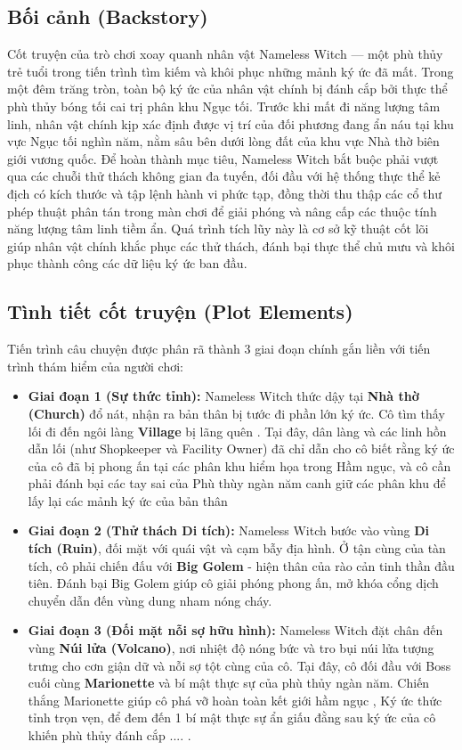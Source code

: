\documentclass[../DoAn.tex]{subfiles}
\begin{document}
\subsection{Bối cảnh (Backstory)}
Cốt truyện của trò chơi xoay quanh nhân vật Nameless Witch — một phù thủy trẻ tuổi trong tiến trình tìm kiếm và khôi phục những mảnh ký ức đã mất. Trong một đêm trăng tròn, toàn bộ ký ức của nhân vật chính bị đánh cắp bởi thực thể phù thủy bóng tối cai trị phân khu Ngục tối. Trước khi mất đi năng lượng tâm linh, nhân vật chính kịp xác định được vị trí của đối phương đang ẩn náu tại khu vực Ngục tối nghìn năm, nằm sâu bên dưới lòng đất của khu vực Nhà thờ biên giới vương quốc. 
Để hoàn thành mục tiêu, Nameless Witch bắt buộc phải vượt qua các chuỗi thử thách không gian đa tuyến, đối đầu với hệ thống thực thể kẻ địch có kích thước và tập lệnh hành vi phức tạp, đồng thời thu thập các cổ thư phép thuật phân tán trong màn chơi để giải phóng và nâng cấp các thuộc tính năng lượng tâm linh tiềm ẩn. Quá trình tích lũy này là cơ sở kỹ thuật cốt lõi giúp nhân vật chính khắc phục các thử thách, đánh bại thực thể chủ mưu và khôi phục thành công các dữ liệu ký ức ban đầu.

\subsection{Tình tiết cốt truyện (Plot Elements)}
Tiến trình câu chuyện được phân rã thành 3 giai đoạn chính gắn liền với tiến trình thám hiểm của người chơi:
\begin{itemize}
    \item \textbf{Giai đoạn 1 (Sự thức tỉnh):} Nameless Witch thức dậy tại \textbf{Nhà thờ (Church)} đổ nát, nhận ra bản thân bị tước đi phần lớn ký ức. Cô tìm thấy lối đi đến ngôi làng \textbf{Village} bị lãng quên . Tại đây, dân làng và các linh hồn dẫn lối (như Shopkeeper và Facility Owner) đã chỉ dẫn cho cô biết rằng ký ức của cô đã bị phong ấn tại các phân khu hiểm họa trong Hầm ngục, và cô cần phải đánh bại các tay sai của Phù thùy ngàn năm canh giữ các phân khu để lấy lại các mảnh ký ức của bản thân
    \item \textbf{Giai đoạn 2 (Thử thách Di tích):} Nameless Witch bước vào vùng \textbf{Di tích (Ruin)}, đối mặt với quái vật và cạm bẫy địa hình. Ở tận cùng của tàn tích, cô phải chiến đấu với \textbf{Big Golem} - hiện thân của rào cản tinh thần đầu tiên. Đánh bại Big Golem giúp cô giải phóng phong ấn, mở khóa cổng dịch chuyển dẫn đến vùng dung nham nóng cháy.
    \item \textbf{Giai đoạn 3 (Đối mặt nỗi sợ hữu hình):} Nameless Witch đặt chân đến vùng \textbf{Núi lửa (Volcano)}, nơi nhiệt độ nóng bức và tro bụi núi lửa tượng trưng cho cơn giận dữ và nỗi sợ tột cùng của cô. Tại đây, cô đối đầu với Boss cuối cùng \textbf{Marionette} và bí mật thực sự của phù thủy ngàn năm. Chiến thắng Marionette giúp cô phá vỡ hoàn toàn kết giới hầm ngục , Ký ức thức tỉnh trọn vẹn, để đem đến 1 bí mật thực sự ẩn giấu đằng sau ký ức của cô khiến phù thủy đánh cắp .... .
\end{itemize}
\end{document}
